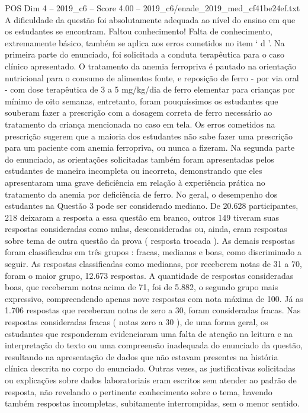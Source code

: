 \begin{textsample}{POS Dim 4 – 2019\_c6 – Score 4.00 – 2019\_c6/enade\_2019\_med\_cf41be24ef.txt}
A dificuldade da questão foi absolutamente adequada ao nível do ensino em que os estudantes se encontram.
Faltou conhecimento!
Falta de conhecimento, extremamente básico, também se aplica aos erros cometidos no item ‘ d ’.
Na primeira parte do enunciado, foi solicitada a conduta terapêutica para o caso clínico apresentado.
O tratamento da anemia ferropriva é pautado na orientação nutricional para o consumo de alimentos fonte, e reposição de ferro - por via oral - com dose terapêutica de 3 a 5 mg/kg/dia de ferro elementar para crianças por mínimo de oito semanas, entretanto, foram pouquíssimos os estudantes que souberam fazer a prescrição com a dosagem correta de ferro necessário ao tratamento da criança mencionada no caso em tela.
Os erros cometidos na prescrição sugerem que a maioria dos estudantes não sabe fazer uma prescrição para um paciente com anemia ferropriva, ou nunca a fizeram.
Na segunda parte do enunciado, as orientações solicitadas também foram apresentadas pelos estudantes de maneira incompleta ou incorreta, demonstrando que eles apresentaram uma grave deficiência em relação à experiência prática no tratamento da anemia por deficiência de ferro.
No geral, o desempenho dos estudantes na Questão 3 pode ser considerado mediano.
De 20.628 participantes, 218 deixaram a resposta a essa questão em branco, outros 149 tiveram suas respostas consideradas como nulas, desconsideradas ou, ainda, eram respostas sobre tema de outra questão da prova ( resposta trocada ).
As demais respostas foram classificadas em três grupos : fracas, medianas e boas, como discriminado a seguir.
As respostas classificadas como medianas, por receberem notas de 31 a 70, foram o maior grupo, 12.673 respostas.
A quantidade de respostas consideradas boas, que receberam notas acima de 71, foi de 5.882, o segundo grupo mais expressivo, compreendendo apenas nove respostas com nota máxima de 100.
Já as 1.706 respostas que receberam notas de zero a 30, foram consideradas fracas.
Nas respostas consideradas fracas ( notas zero a 30 ), de uma forma geral, os estudantes que responderam evidenciaram uma falta de atenção na leitura e na interpretação do texto ou uma compreensão inadequada do enunciado da questão, resultando na apresentação de dados que não estavam presentes na história clínica descrita no corpo do enunciado.
Outras vezes, as justificativas solicitadas ou explicações sobre dados laboratoriais eram escritos sem atender ao padrão de resposta, não revelando o pertinente conhecimento sobre o tema, havendo também respostas incompletas, subitamente interrompidas, sem o menor sentido.

\end{textsample}
